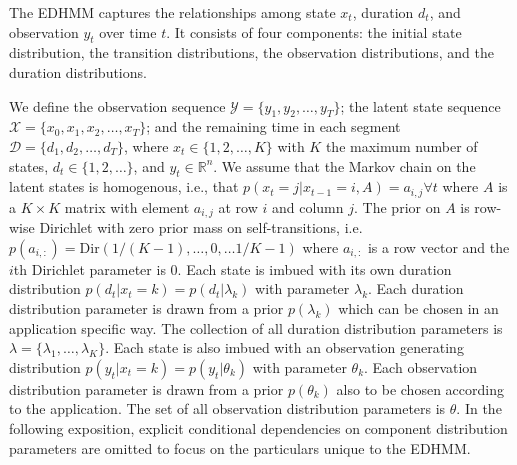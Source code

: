 The EDHMM captures the relationships among state $x_t$, duration $d_t$, and  observation $y_t$ over time $t$. It consists of four components: the initial state distribution, the transition distributions, the observation distributions, and the duration distributions. 

We define the observation sequence $\mathcal{Y} = \{y_1, y_2, \ldots, y_T\}$; the latent state sequence $\mathcal{X} = \{x_0, x_1, x_2, \ldots, x_T\}$; and the remaining time in each segment $\mathcal{D} = \{ d_1, d_2, \ldots, d_T\}$, where $x_t \in \{ 1, 2, \ldots, K\}$ with $K$ the maximum number of states, $d_t \in \{1, 2, \ldots \}$, and $y_t \in \mathbb{R}^n$.     We assume that the Markov chain on the latent states is homogenous, i.e., that $p(x_t = j | x_{t-1}=i, A) = a_{i,j} \forall t$ where $A$ is a $K\times K$ matrix with element $a_{i,j}$ at row $i$ and column $j.$  The prior on $A$ is row-wise Dirichlet with zero prior mass on self-transitions, i.e.  $p(a_{i,:}) = \mathrm{Dir}({1}/{(K-1)}, \ldots, 0 , \ldots {1}/{K-1})$ where $a_{i,:}$ is a row vector and the $i$th Dirichlet parameter is $0.$  Each state is imbued with its own duration distribution $p(d_t | x_t = k) = p(d_t | \lambda_{k})$ with parameter $\lambda_k$.  Each duration distribution parameter is drawn from a prior $p(\lambda_k)$ which can be chosen in an application specific way.  The collection of all duration distribution parameters is $\lambda = \{\lambda_1, \ldots, \lambda_K\}$.  Each state is also imbued with an observation generating distribution $p(y_t  | x_t = k) = p(y_t | \theta_{k})$ with parameter $\theta_k$.  Each observation distribution parameter is drawn from a prior $p(\theta_k)$ also to be chosen according to the application. The set of all observation distribution parameters is $\theta.$  In the following exposition, explicit conditional dependencies on component distribution parameters are omitted to focus on the particulars unique to the EDHMM.

